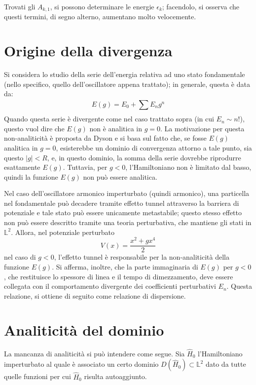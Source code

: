 \documentclass[10pt, a4paper]{scrartcl} %
\numberwithin{equation}{section}
\theoremstyle{style2}
\theoremstyle{style1}
\begin{document}
Trovati gli $A_{k,1} $, si possono determinare le energie $\epsilon _k$; facendolo, si osserva che questi termini, di segno alterno, aumentano molto velocemente.

\section{Origine della divergenza}
Si considera lo studio della serie dell'energia relativa ad uno stato fondamentale (nello specifico, quello dell'oscillatore appena trattato); in generale, questa \`e data da:
\begin{equation}
	E(g) = E_0 + \sum_{}^{} E_n g^n
\end{equation}
Quando questa serie \`e divergente come nel caso trattato sopra (in cui $E_n \sim n!$), questo vuol dire che $E(g)$ non \`e analitica in $g=0$.
La motivazione per questa non-analiticit\`a \`e proposta da Dyson e si basa sul fatto che, se fosse $E(g)$ analitica in $g=0$, esisterebbe un dominio di convergenza attorno a tale punto, sia questo $\lvert g \rvert < R$, e, in questo dominio, la somma della serie dovrebbe riprodurre esattamente $E(g)$.
Tuttavia, per $g<0$, l'Hamiltoniano non \`e limitato dal basso, quindi la funzione $E(g)$ non pu\`o essere analitica. 

Nel caso dell'oscillatore armonico imperturbato (quindi armonico), una particella nel fondamentale pu\`o decadere tramite effetto tunnel attraverso la barriera di potenziale e tale stato pu\`o essere unicamente metastabile; questo stesso effetto non pu\`o essere descritto tramite una teoria perturbativa, che mantiene gli stati in $\mathbb{L}^2$. 
Allora, nel potenziale perturbato
\[
V(x) = \frac{x^2 + gx^4 }{2}
\] 
nel caso di $g< 0$, l'effetto tunnel \`e responsabile per la non-analiticit\`a della funzione $E(g)$.
Si afferma, inoltre, che la parte immaginaria di $E(g)$ per $g<0$, che restituisce lo spessore di linea e il tempo di dimezzamento, deve essere collegata con il comportamento divergente dei coefficienti perturbativi $E_n$.
Questa relazione, si ottiene di seguito come relazione di dispersione.
\section{Analiticit\`a del dominio}
La mancanza di analiticit\`a si pu\`o intendere come segue.
Sia $\hat{H}_0$ l'Hamiltoniano imperturbato al quale \`e associato un certo dominio $D(\hat{H}_0)\subset \mathbb{L}^2$ dato da tutte quelle funzioni per cui $\hat{H}_0$ risulta autoaggiunto.
\end{document}

